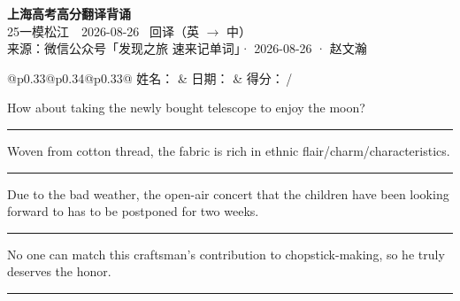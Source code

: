 \documentclass[11pt,a4paper]{article}
\newcommand{\num}[1]{\makebox[1.9em][r]{#1.}\hspace{0.3em}}
\newcommand{\wline}{\noindent\rule{\linewidth}{0.4pt}}
\begin{document}
\pagestyle{plain}
\begin{center}
{\LARGE\bfseries 上海高考高分翻译背诵 }\\[0.25em]
{\large 25一模松江　2026-08-26 \quad\ 回译（英 $\to$ 中）}\\[0.35em]
{\footnotesize 来源：微信公众号「发现之旅 速来记单词」· 2026-08-26 · 赵文瀚}
\end{center}

\vspace{0.4em}
\noindent\begin{tabular}{@{}p{0.33\textwidth}@{}p{0.34\textwidth}@{}p{0.33\textwidth}@{}}
姓名：\underline{\hspace{2.0cm}} & 日期：\underline{\hspace{2.0cm}} & 得分：\underline{\hspace{1.4cm}}\,/ \\
\end{tabular}

\vspace{0.5em}

\vspace{0.8em}
\num{1}How about taking the newly bought telescope to enjoy the moon?

\vspace{0.25em}

\wline

\num{2}Woven from cotton thread, the fabric is rich in ethnic flair/charm/characteristics.

\vspace{0.25em}

\wline

\num{3}Due to the bad weather, the open-air concert that the children have been looking forward to has to be postponed for two weeks.

\vspace{0.25em}

\wline

\num{4}No one can match this craftsman’s contribution to chopstick-making, so he truly deserves the honor.

\vspace{0.25em}

\wline
\end{document}
